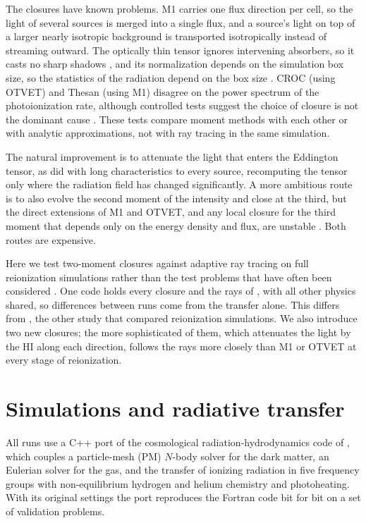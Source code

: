 \documentclass[iop]{openjournal}
\begin{document}
The closures have known problems. M1 carries one flux direction per cell,
so the light of several sources is merged into a single flux, and a source's light on top of a larger nearly isotropic background is transported isotropically instead of streaming outward.  The optically thin tensor ignores intervening absorbers, so
it casts no sharp shadows \citep{gnedin01,petkova09}, and its
normalization depends on the simulation box size, so the statistics of the radiation depend on the box size \citep{wu21}. CROC (using OTVET) and Thesan (using M1) disagree
on the power spectrum of the photoionization rate, although controlled
tests suggest the choice of closure is not the dominant cause
\citep{gnedin25}. These tests compare moment methods with each other or
with analytic approximations, not with ray tracing in the same
simulation.

The natural improvement is to attenuate the light that enters the
Eddington tensor, as \citet{finlator09} did with long characteristics to
every source, recomputing the tensor only where the radiation field has
changed significantly. A more ambitious route is to also evolve the
second moment of the intensity and close at the third, but the direct
extensions of M1 and OTVET, and any local closure for the third moment
that depends only on the energy density and flux, are unstable
\citep{gnedinkatz26}. Both routes are expensive.

Here we test two-moment closures against adaptive ray tracing on full reionization simulations rather than the test problems that have often been considered \citep{iliev06,iliev09,wu21,gnedinkatz26}. One code
holds every closure and the rays of \citet{trac07}, with all other
physics shared, so differences between runs come from the transfer alone.  This differs from \citet{gnedin25}, the other study that compared reionization simulations.
We also introduce two new closures; the more sophisticated of them, which
attenuates the light by the HI along each direction, follows the rays
more closely than M1 or OTVET at every stage of reionization. 
\section{Simulations and radiative transfer}\label{sec:methods}


All runs use a C++ port of the cosmological radiation-hydrodynamics code
of \citet{trac07}, which couples a
particle-mesh (PM) $N$-body solver for the dark matter, an Eulerian solver
for the gas, and the transfer of ionizing radiation in five frequency
groups with non-equilibrium hydrogen and helium chemistry and
photoheating. With its original settings the port reproduces the Fortran
code bit for bit on a set of validation problems. %
\end{document}
